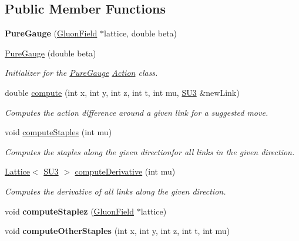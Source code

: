 \subsection*{Public Member Functions}
\begin{DoxyCompactItemize}
\item 
{\bfseries Pure\+Gauge} (\hyperlink{classField}{Gluon\+Field} $\ast$lattice, double beta)\hypertarget{classPureGauge_ae832fd1e6b53f6ca3d22961f4a2f80f7}{}\label{classPureGauge_ae832fd1e6b53f6ca3d22961f4a2f80f7}

\item 
\hyperlink{classPureGauge_ab219e717e036ee44696ba360a2b3674b}{Pure\+Gauge} (double beta)
\begin{DoxyCompactList}\small\item\em Initializer for the \hyperlink{classPureGauge}{Pure\+Gauge} \hyperlink{classAction}{Action} class. \end{DoxyCompactList}\item 
double \hyperlink{classPureGauge_a17facfc54c75a588826c00f8ef185bf0}{compute} (int x, int y, int z, int t, int mu, \hyperlink{structSU3}{S\+U3} \&new\+Link)\hypertarget{classPureGauge_a17facfc54c75a588826c00f8ef185bf0}{}\label{classPureGauge_a17facfc54c75a588826c00f8ef185bf0}

\begin{DoxyCompactList}\small\item\em Computes the action difference around a given link for a suggested move. \end{DoxyCompactList}\item 
void \hyperlink{classPureGauge_a7c78eb206450a209b4154fc936d8aad1}{compute\+Staples} (int mu)
\begin{DoxyCompactList}\small\item\em Computes the staples along the given directionfor all links in the given direction. \end{DoxyCompactList}\item 
\hyperlink{classLattice}{Lattice}$<$ \hyperlink{structSU3}{S\+U3} $>$ \hyperlink{classPureGauge_a0d9272be98cf62567bbda93a892718eb}{compute\+Derivative} (int mu)
\begin{DoxyCompactList}\small\item\em Computes the derivative of all links along the given direction. \end{DoxyCompactList}\item 
void {\bfseries compute\+Staplez} (\hyperlink{classField}{Gluon\+Field} $\ast$lattice)\hypertarget{classPureGauge_a28706ff95422d3ac6e1dc9d2aabccf1a}{}\label{classPureGauge_a28706ff95422d3ac6e1dc9d2aabccf1a}

\item 
void {\bfseries compute\+Other\+Staples} (int x, int y, int z, int t, int mu)\hypertarget{classPureGauge_a5722f484c169539471da120aefa97dea}{}\label{classPureGauge_a5722f484c169539471da120aefa97dea}

\end{DoxyCompactItemize}
